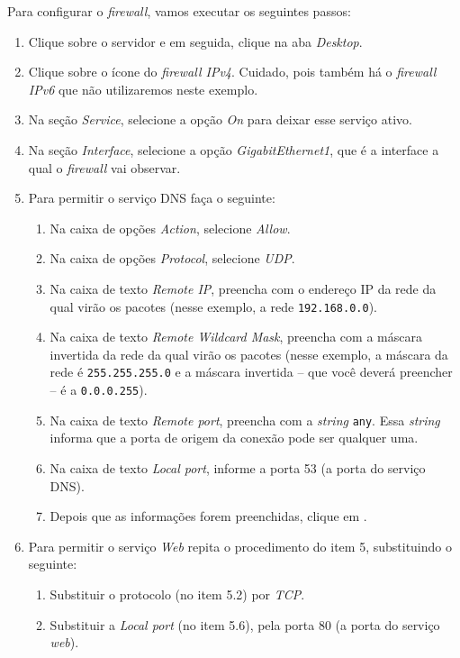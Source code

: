 Para configurar o \textit{firewall}, vamos executar os seguintes passos:

\begin{enumerate}[label*=\arabic*.]
\item Clique sobre o servidor e em seguida, clique na aba \textit{Desktop}.
\item Clique sobre o ícone do \textit{firewall IPv4}. Cuidado, pois também há o \textit{firewall IPv6} que não utilizaremos neste exemplo.
\item Na seção \textit{Service}, selecione a opção \textit{On} para deixar esse serviço ativo.
\item Na seção \textit{Interface}, selecione a opção \textit{GigabitEthernet1}, que é a interface a qual o \textit{firewall} vai observar.
\item Para permitir o serviço DNS faça o seguinte:  
   \begin{enumerate}[label*=\arabic*.]
      \item Na caixa de opções \textit{Action}, selecione \textit{Allow}.
      \item Na caixa de opções \textit{Protocol}, selecione \textit{UDP}.
      \item Na caixa de texto \textit{Remote IP}, preencha com o endereço IP da rede da qual virão os pacotes (nesse exemplo, a rede \texttt{192.168.0.0}).
      \item Na caixa de texto \textit{Remote Wildcard Mask}, preencha com a máscara invertida da rede da qual virão os pacotes (nesse exemplo, a máscara da rede é \texttt{255.255.255.0} e a máscara invertida -- que você deverá preencher -- é a \texttt{0.0.0.255}).
      \item Na caixa de texto \textit{Remote port}, preencha com a \textit{string} \texttt{any}. Essa \textit{string} informa que a porta de origem da conexão pode ser qualquer uma.
      \item Na caixa de texto \textit{Local port}, informe a porta 53 (a porta do serviço DNS).
      \item Depois que as informações forem preenchidas, clique em .
   \end{enumerate}
\item Para permitir o serviço \textit{Web} repita o procedimento do item 5, substituindo o seguinte:
   \begin{enumerate}[label*=\arabic*.]
      \item Substituir o protocolo (no item 5.2) por \textit{TCP}.
      \item Substituir a \textit{Local port} (no item 5.6), pela porta 80 (a porta do serviço \textit{web}).
    \end{enumerate}
\end{enumerate}

